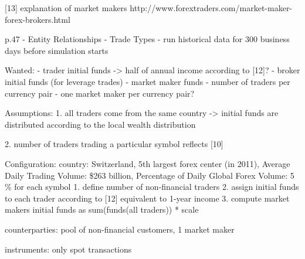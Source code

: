 [13] explanation of market makers
http://www.forextraders.com/market-maker-forex-brokers.html

p.47 
- Entity Relationships
- Trade Types
- run historical data for 300 business days before simulation starts

Wanted:
- trader initial funds -> half of annual income according to [12]?
- broker initial funds (for leverage trades)
- market maker funds
- number of traders per currency pair
- one market maker per currency pair?

Assumptions:
1. all traders come from the same country
    -> initial funds are distributed according to the local wealth distribution

    2. number of traders trading a particular symbol reflects [10]

    Configuration:
    country:    Switzerland, 5th largest forex center (in 2011), Average Daily Trading Volume: \$263 billion, Percentage of Daily Global Forex Volume: 5 \%
    for each symbol
    1. define number of non-financial traders
    2. assign initial funds to each trader according to [12] equivalent to 1-year income
    3. compute market makers initial funds as sum(funds(all traders)) * scale


    counterparties: pool of non-financial customers, 1 market maker

    instruments:    only spot transactions

